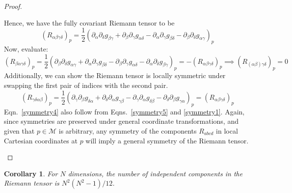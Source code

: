 \documentclass[a4paper]{article}
\theoremstyle{new}
\newtheorem{cor}{Corollary}[section]
\begin{document}
\begin{proof}
\begin{enumerate}
    Hence, we have the fully covariant Riemann tensor to be
    \begin{equation}
    (R_{\alpha\beta\gamma\delta})_p=\frac{1}{2}(\partial_\alpha\partial_\delta g_{\beta\gamma}+\partial_\beta\partial_\gamma g_{\alpha\delta}-\partial_\alpha\partial_\gamma g_{\beta\delta}-\partial_\beta\partial_\delta g_{\alpha\gamma})_p\label{covRiemann}
    \end{equation}
    Now, evaluate:
    $$(R_{\beta\alpha\gamma\delta})_p=\frac{1}{2}(\partial_\beta\partial_\delta g_{\alpha\gamma}+\partial_\alpha\partial_\gamma g_{\beta\delta}-\partial_\beta\partial_\gamma g_{\alpha\delta}-\partial_\alpha\partial_\delta g_{\beta\gamma})_p=-(R_{\alpha\beta\gamma\delta})_p\implies (R_{(\alpha\beta)\gamma\delta})_p=0$$
    Additionally, we can show the Riemann tensor is locally symmetric under swapping the first pair of indices with the second pair.
    \begin{equation}
    (R_{\gamma\delta\alpha\beta})_p=\frac{1}{2}(\partial_\gamma\partial_\beta g_{\delta\alpha}+\partial_\delta\partial_\alpha g_{\gamma\beta}-\partial_\gamma\partial_\alpha g_{\delta\beta}-\partial_\delta\partial_\beta g_{\gamma\alpha})_p=(R_{\alpha\beta\gamma\delta})_p\label{symmetry5}
    \end{equation}
    Eqn.~\ref{symmetry4} also follow from Eqns.~\ref{symmetry5} and \ref{symmetry1}. Again, since symmetries are preserved under general coordinate transformations, and given that $p\in\mathcal{M}$ is arbitrary, any symmetry of the components $R_{abcd}$ in local Cartesian coordinates at $p$ will imply a general symmetry of the Riemann tensor.
\end{enumerate}
\end{proof}
\begin{cor}
For $N$ dimensions, the number of independent components in the Riemann tensor is $N^2(N^2-1)/12$.
\end{cor}
\end{document}
